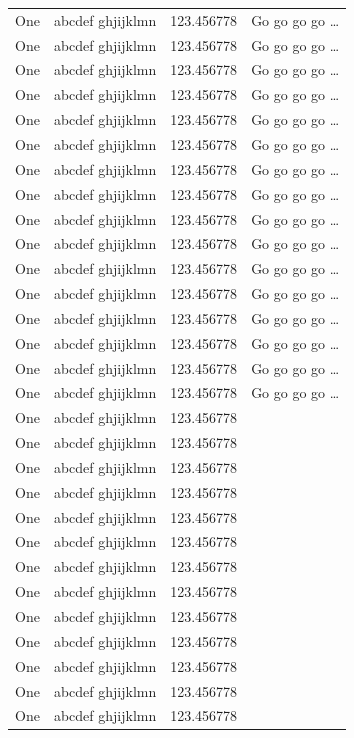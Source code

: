 \documentclass[phd]{ndsu-thesis-2022}
\begin{document}
\begin{longtable}{l l l l}
One & abcdef ghjijklmn & 123.456778  & Go go go go \ldots \\
One & abcdef ghjijklmn & 123.456778  & Go go go go \ldots \\
One & abcdef ghjijklmn & 123.456778  & Go go go go \ldots \\
One & abcdef ghjijklmn & 123.456778  & Go go go go \ldots \\
One & abcdef ghjijklmn & 123.456778  & Go go go go \ldots \\
One & abcdef ghjijklmn & 123.456778  & Go go go go \ldots \\
One & abcdef ghjijklmn & 123.456778  & Go go go go \ldots \\
One & abcdef ghjijklmn & 123.456778  & Go go go go \ldots \\
One & abcdef ghjijklmn & 123.456778  & Go go go go \ldots \\
One & abcdef ghjijklmn & 123.456778  & Go go go go \ldots \\
One & abcdef ghjijklmn & 123.456778  & Go go go go \ldots \\
One & abcdef ghjijklmn & 123.456778  & Go go go go \ldots \\
One & abcdef ghjijklmn & 123.456778  & Go go go go \ldots \\
One & abcdef ghjijklmn & 123.456778  & Go go go go \ldots \\
One & abcdef ghjijklmn & 123.456778  & Go go go go \ldots \\
One & abcdef ghjijklmn & 123.456778  & Go go go go \ldots \\
One & abcdef ghjijklmn & 123.456778 \\
One & abcdef ghjijklmn & 123.456778 \\
One & abcdef ghjijklmn & 123.456778 \\
One & abcdef ghjijklmn & 123.456778 \\
One & abcdef ghjijklmn & 123.456778 \\
One & abcdef ghjijklmn & 123.456778 \\
One & abcdef ghjijklmn & 123.456778 \\
One & abcdef ghjijklmn & 123.456778 \\
One & abcdef ghjijklmn & 123.456778 \\
One & abcdef ghjijklmn & 123.456778 \\
One & abcdef ghjijklmn & 123.456778 \\
One & abcdef ghjijklmn & 123.456778 \\
One & abcdef ghjijklmn & 123.456778 \\

\end{longtable}
\end{document}
